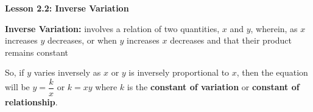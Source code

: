  \begin{center}
\textbf{Lesson 2.2: Inverse Variation}
\end{center}

\vspace*{1ex}

\textbf{Inverse Variation:} involves a relation of two quantities, $x$ and $y$, wherein, as $x$ increases $y$ decreases, or when $y$ increases $x$ decreases and that their product remains constant

 So, if $y$ varies inversely as $x$ or $y$ is inversely proportional to $x$, then the equation will be $y = \dfrac{k}{x}$ or $k = xy$ where $k$ is the \textbf{constant of variation} or \textbf{constant of relationship}.

